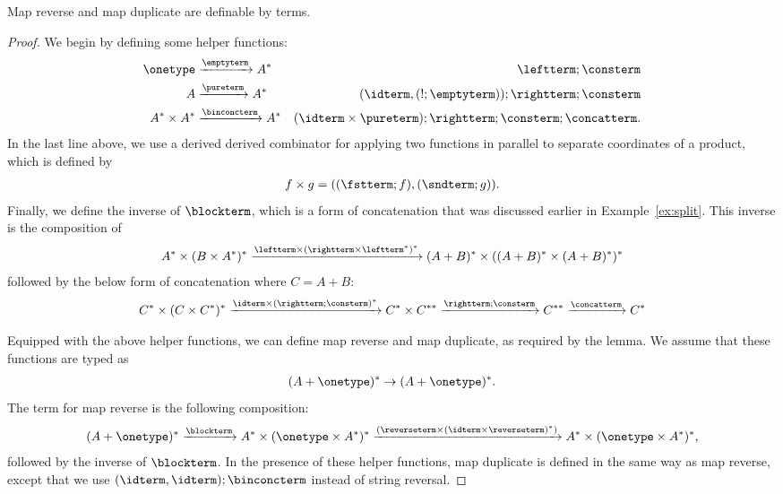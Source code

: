 \begin{lemma}\label{lem:terms-define-map-reverse-duplicate}
   Map reverse and map duplicate are definable by terms.
\end{lemma}
\begin{proof}
    We begin by defining some helper functions:
            \begin{align*}
        \onetype & \xrightarrow \emptyterm A^*  & \leftterm; \consterm \\ 
        A & \xrightarrow \pureterm A^* & (\idterm, (!;\emptyterm));\rightterm;\consterm\\
        A^* \times A^* & \xrightarrow \binconcterm A^* & (\idterm \times \pureterm); \rightterm; \consterm; \concatterm .
        \end{align*}
    In the last line above,  we  use a derived derived combinator for applying two functions in parallel to separate coordinates of a product, which is defined by
    \begin{align*}
    f \times g = ((\fstterm;f),(\sndterm;g)).
    \end{align*}
    Finally, we define the inverse of $\blockterm$, which is a form of concatenation that was discussed earlier in Example~\ref{ex:split}. This inverse is the composition of 
    \begin{align*}
    A^* \times (B \times A^*)^* \xrightarrow{\leftterm \times (\rightterm \times \leftterm^*)^*} (A+B)^* \times ((A+B)^* \times (A+B)^*)^*
    \end{align*}
    followed by the below form of concatenation where $C = A+B$:
    \begin{align*}
    C^* \times (C \times C^*)^* \xrightarrow{ \idterm \times (\rightterm; \consterm)^*} C^* \times C^{**} \xrightarrow{\rightterm;\consterm} C^{**} \xrightarrow \concatterm C^*
    \end{align*}

    Equipped with the above helper functions, we can define map reverse and map duplicate, as required by the lemma.
    We assume that these functions are typed as 
    \begin{align*}
    (A + \onetype)^* \to (A + \onetype)^*.
    \end{align*}
    The term for map reverse is the following composition:
    \begin{align*}
    (A + \onetype)^* \xrightarrow{\blockterm} A^* \times (\onetype \times A^*)^* \xrightarrow{(\reverseterm \times (\idterm \times \reverseterm)^*)} A^* \times (\onetype \times A^*)^*,
    \end{align*}
    followed by the inverse of $\blockterm$. In the presence of these helper functions, map duplicate is defined in the same way as map reverse, except that we use $(\idterm,\idterm);\binconcterm$ instead of string reversal.
\end{proof}

